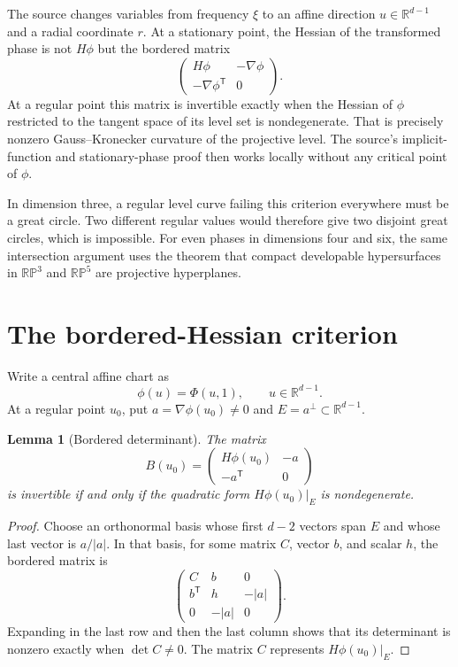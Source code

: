 \documentclass[11pt]{amsart}
\newtheorem{lemma}[theorem]{Lemma}
\theoremstyle{remark}
\newcommand{\R}{\mathbb R}
\newcommand{\RP}{\mathbb {RP}}
\begin{document}
The source changes variables from frequency $\xi$ to an affine direction
$u\in\R^{d-1}$ and a radial coordinate $r$.  At a stationary point, the
Hessian of the transformed phase is not $H\phi$ but the bordered matrix
\[
 \begin{pmatrix}H\phi&-\nabla\phi\\
                 -\nabla\phi^{\mathsf T}&0\end{pmatrix}.
\]
At a regular point this matrix is invertible exactly when the Hessian of
$\phi$ restricted to the tangent space of its level set is nondegenerate.
That is precisely nonzero Gauss--Kronecker curvature of the projective level.
The source's implicit-function and stationary-phase proof then works locally
without any critical point of $\phi$.

In dimension three, a regular level curve failing this criterion everywhere
must be a great circle.  Two different regular values would therefore give
two disjoint great circles, which is impossible.  For even phases in
dimensions four and six, the same intersection argument uses the theorem that
compact developable hypersurfaces in $\RP^3$ and $\RP^5$ are projective
hyperplanes.

\section{The bordered-Hessian criterion}

Write a central affine chart as
\[
 \phi(u)=\Phi(u,1),\qquad u\in\R^{d-1}.
\]
At a regular point $u_0$, put $a=\nabla\phi(u_0)\ne0$ and
$E=a^\perp\subset\R^{d-1}$.

\begin{lemma}[Bordered determinant]\label{lem:border}
The matrix
\[
 B(u_0)=
 \begin{pmatrix}
 H\phi(u_0)&-a\\-a^{\mathsf T}&0
 \end{pmatrix}
\]
is invertible if and only if the quadratic form
$H\phi(u_0)|_E$ is nondegenerate.
\end{lemma}

\begin{proof}
Choose an orthonormal basis whose first $d-2$ vectors span $E$ and whose last
vector is $a/|a|$.  In that basis, for some matrix $C$, vector $b$, and scalar
$h$, the bordered matrix is
\[
 \begin{pmatrix}
 C&b&0\\ b^{\mathsf T}&h&-|a|\\0&-|a|&0
 \end{pmatrix}.
\]
Expanding in the last row and then the last column shows that its determinant
is nonzero exactly when $\det C\ne0$.  The matrix $C$ represents
$H\phi(u_0)|_E$.
\end{proof}
\end{document}
